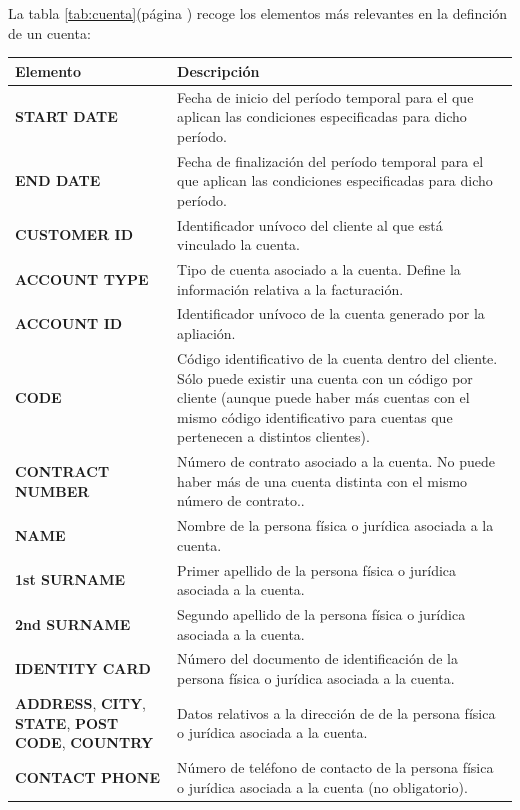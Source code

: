 La tabla \ref{tab:cuenta}(página \pageref{tab:cuenta}) recoge los elementos más relevantes en la definción de un cuenta:

\begin{table}[H]
  \centering
  \setlength{\leftmargini}{0.4cm}
  \resizebox{14cm}{!} {
  \begin{tabular}{|m{6cm} m{8cm}|}
  \rowcolor{udcpink!25}
  \hline
  	\textbf{Elemento} & \textbf{Descripción} \\\hline
  	\textbf{START DATE} & Fecha de inicio del período temporal para el que aplican las condiciones especificadas para dicho período.\\
  	\textbf{END DATE} & Fecha de finalización del período temporal para el que aplican las condiciones especificadas para dicho período.\\
	\textbf{CUSTOMER ID} & Identificador unívoco del cliente al que está vinculado la cuenta.\\
	\textbf{ACCOUNT TYPE} & Tipo de cuenta asociado a la cuenta. Define la información relativa a la facturación.\\
	\textbf{ACCOUNT ID} & Identificador unívoco de la cuenta generado por la apliación.\\
	\textbf{CODE} & Código identificativo de la cuenta dentro del cliente. Sólo puede existir una cuenta con un código por cliente (aunque puede haber más cuentas con el mismo código identificativo para cuentas que pertenecen a distintos clientes).\\
	\textbf{CONTRACT NUMBER} & Número de contrato asociado a la cuenta. No puede haber más de una cuenta distinta con el mismo número de contrato..\\
	\textbf{NAME} & Nombre de la persona física o jurídica asociada a la cuenta.\\
	\textbf{1st SURNAME} & Primer apellido de la persona física o jurídica asociada a la cuenta.\\
	\textbf{2nd SURNAME} & Segundo apellido de la persona física o jurídica asociada a la cuenta.\\
	\textbf{IDENTITY CARD} & Número del documento de identificación de la persona física o jurídica asociada a la cuenta.\\	
	\textbf{ADDRESS}, \textbf{CITY}, \textbf{STATE}, \textbf{POST CODE}, \textbf{COUNTRY}  & Datos relativos a la dirección de de la persona física o jurídica asociada a la cuenta.\\	
	\textbf{CONTACT PHONE} & Número de teléfono de contacto de la persona física o jurídica asociada a la cuenta (no obligatorio).\\

\end{tabular}}
\end{table}
